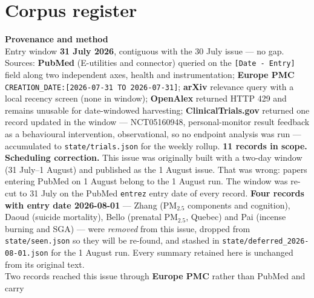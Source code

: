 \documentclass[10pt]{article}
\begin{document}
\vspace{4mm}

\section*{\sffamily\bfseries\color{Deep}Corpus register}
\vspace{-1.5mm}{\color{Amber}\rule{\linewidth}{1.1pt}}\vspace{2.5mm}



\vspace{4mm}
\begin{keybox}
{\sffamily\bfseries\footnotesize\color{Deep}Provenance and method}\\[1.2mm]
{\fontsize{7.2}{8.8}\selectfont
Entry window \textbf{31 July 2026}, contiguous with the 30 July issue --- no gap.
Sources: \textbf{PubMed} (E-utilities and connector) queried on the \texttt{[Date -
Entry]} field along two independent axes, health and instrumentation; \textbf{Europe PMC}
\texttt{CREATION\_DATE:[2026-07-31 TO 2026-07-31]}; \textbf{arXiv} relevance query with a
local recency screen (none in window); \textbf{OpenAlex} returned HTTP 429 and remains
unusable for date-windowed harvesting; \textbf{ClinicalTrials.gov} returned one record
updated in the window --- NCT05160948, personal-monitor result feedback as a behavioural
intervention, observational, so no endpoint analysis was run --- accumulated to
\texttt{state/trials.json} for the weekly rollup. \textbf{11 records in scope.}
\\[1.0mm]
\textbf{Scheduling correction.} This issue was originally built with a two-day window
(31 July--1 August) and published as the 1 August issue. That was wrong: papers entering
PubMed on 1 August belong to the 1 August run. The window was re-cut to 31 July on the
PubMed \texttt{entrez} entry date of every record. \textbf{Four records with entry date
2026-08-01} --- Zhang (PM$_{2.5}$ components and cognition), Daoud (suicide mortality),
Bello (prenatal PM$_{2.5}$, Quebec) and Pai (incense burning and SGA) --- were
\emph{removed} from this issue, dropped from \texttt{state/seen.json} so they will be
re-found, and stashed in \texttt{state/deferred\_2026-08-01.json} for the 1 August run.
Every summary retained here is unchanged from its original text.
\\[1.0mm]
Two records reached this issue through \textbf{Europe PMC} rather than PubMed and carry
}
\end{keybox}
\end{document}
